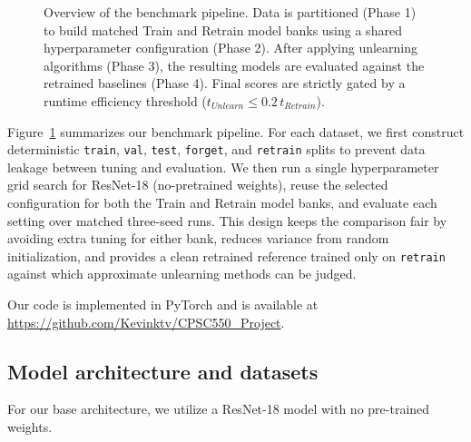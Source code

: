 \documentclass{article}
\begin{document}
\begin{figure}[htbp]
{%
    }
    \caption{Overview of the benchmark pipeline. Data is partitioned (Phase 1) to build matched Train and Retrain model banks using a shared hyperparameter configuration (Phase 2). After applying unlearning algorithms (Phase 3), the resulting models are evaluated against the retrained baselines (Phase 4). Final scores are strictly gated by a runtime efficiency threshold ($t_{Unlearn} \leq 0.2\,t_{Retrain}$).}
\label{fig:pipeline}
\end{figure}


Figure~\ref{fig:pipeline} summarizes our benchmark pipeline. For each dataset, we first construct deterministic \texttt{train}, \texttt{val}, \texttt{test}, \texttt{forget}, and \texttt{retrain} splits to prevent data leakage between tuning and evaluation. We then run a single hyperparameter grid search for ResNet-18 (no-pretrained weights), reuse the selected configuration for both the Train and Retrain model banks, and evaluate each setting over matched three-seed runs. This design keeps the comparison fair by avoiding extra tuning for either bank, reduces variance from random initialization, and provides a clean retrained reference trained only on \texttt{retrain} against which approximate unlearning methods can be judged.

Our code is implemented in PyTorch and is available at \url{https://github.com/Kevinktv/CPSC550_Project}.

\subsection{Model architecture and datasets}
For our base architecture, we utilize a ResNet-18 model with no pre-trained weights. 
\end{document}
